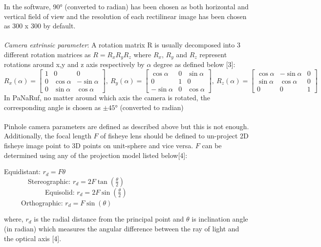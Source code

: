 \documentclass{article}
\begin{document}
In the software, \ang{90} (converted to radian) has been chosen as both horizontal and vertical field of view and the resolution of each rectilinear image has been chosen as 300 x 300 by default.\\~\\
\textit{Camera extrinsic parameter}:
A rotation matrix R is usually decomposed into 3 different rotation matrices as 
$R =  R_{x} R_{y} R_{z}$ where $R_{x}$, $R_{y}$ and $R_{z}$ represent rotations around x,y and z axis respectively by $\alpha$ degree as defined below [3]:
\begin{equation*}
   \scriptstyle  R_{x}(\alpha) = \begin{bmatrix}
			1 & 0 & 0\\
			0 & \cos{\alpha} & -\sin{\alpha}\\
            0 & \sin{\alpha} & \cos{\alpha}
			\end{bmatrix}, \        
	R_{y}(\alpha) =  \begin{bmatrix}
			\cos{\alpha} & 0 & \sin{\alpha}\\
			0 & 1 & 0\\
            -\sin{\alpha} & 0 & \cos{\alpha}
			\end{bmatrix}, \ 
	R_{z}(\alpha) = \begin{bmatrix}
			\cos{\alpha} & -\sin{\alpha} & 0\\
			\sin{\alpha} & \cos{\alpha} & 0\\
            0 & 0 & 1
			\end{bmatrix}    
\end{equation*}
In PaNaRuf, no matter around which axis the camera is rotated, the corresponding angle is chosen as $\pm\ang{45}$ (converted to radian)\\~\\
Pinhole camera parameters are defined as described above but this is not enough. Additionally, the focal length $F$ of fisheye lens should be defined to un-project 2D fisheye image point to 3D points on unit-sphere and vice versa. $F$ can be determined using any of the projection model listed below[4]: 
\begin{center}
Equidistant: $r_{d} = F \theta$\\
\ \ \ \ \ \ \ Stereographic: $r_{d} = 2F \tan(\frac{\theta}{2})$\\
\ \ \ \ \ \ \ \ \ \ \ \ Equisolid: $r_{d} = 2F \sin(\frac{\theta}{2})$\\
\ \ \ \ \ Orthographic: $r_{d} = F \sin(\theta)$\\
\end{center}
where, $r_d$ is the radial distance from the principal point and $\theta$ is inclination angle (in radian) which measures the angular difference between the ray of light and the optical axis [4].
\end{document}
